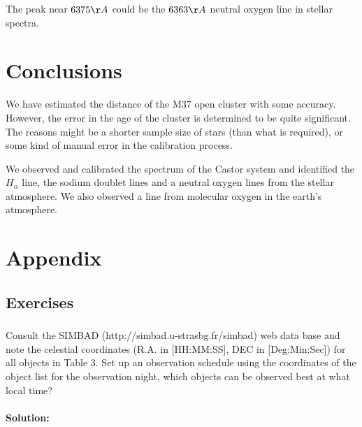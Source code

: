 \documentclass[12pt,a4paper]{article}
\begin{document}

      The peak near $6375 \AA$ could be the $6363 \AA$ neutral oxygen line in stellar spectra.\\




\section{Conclusions}
\label{sec:conclusion}
We have estimated the distance of the M37 open cluster with some accuracy. However, the error in the age of the cluster is determined to be quite significant. The reasons might be a shorter sample size of stars (than what is required), or some kind of manual error in the calibration process.


We observed and calibrated the spectrum of the Castor system and identified the $H_\alpha$ line, the sodium doublet lines and a neutral oxygen lines from the stellar atmosphere. We also observed a line from molecular oxygen in the earth's atmosphere.
\setcounter{secnumdepth}{0}

\printbibliography
\appendix
\section{Appendix}
\subsection{Exercises}
\subsubsection*{}
Consult the SIMBAD (http://simbad.u-strasbg.fr/simbad) web data base and note the celestial coordinates (R.A. in [HH:MM:SS], DEC in [Deg:Min:Sec]) for all objects in Table 3. Set up an observation schedule using the coordinates of the object list for the observation night, which objects can be observed best at what local time? \\
\\ \textbf{Solution:}
\end{document}
